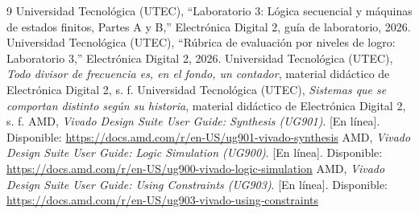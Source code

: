 \documentclass[conference]{IEEEtran}
\begin{document}
\begin{thebibliography}{9}
 Universidad Tecnológica (UTEC), ``Laboratorio 3: Lógica secuencial y máquinas de estados finitos, Partes A y B,'' Electrónica Digital 2, guía de laboratorio, 2026.
 Universidad Tecnológica (UTEC), ``Rúbrica de evaluación por niveles de logro: Laboratorio 3,'' Electrónica Digital 2, 2026.
 Universidad Tecnológica (UTEC), \emph{Todo divisor de frecuencia es, en el fondo, un contador}, material didáctico de Electrónica Digital 2, s. f.
 Universidad Tecnológica (UTEC), \emph{Sistemas que se comportan distinto según su historia}, material didáctico de Electrónica Digital 2, s. f.
 AMD, \emph{Vivado Design Suite User Guide: Synthesis (UG901)}. [En línea]. Disponible: \url{https://docs.amd.com/r/en-US/ug901-vivado-synthesis}
 AMD, \emph{Vivado Design Suite User Guide: Logic Simulation (UG900)}. [En línea]. Disponible: \url{https://docs.amd.com/r/en-US/ug900-vivado-logic-simulation}
 AMD, \emph{Vivado Design Suite User Guide: Using Constraints (UG903)}. [En línea]. Disponible: \url{https://docs.amd.com/r/en-US/ug903-vivado-using-constraints}
\end{thebibliography}
\end{document}
